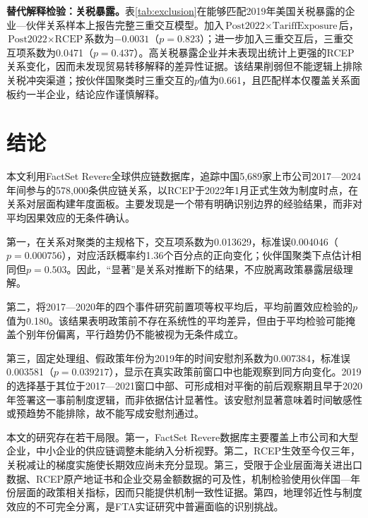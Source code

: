 \documentclass[12pt,a4paper]{ctexart}
\begin{document}
\textbf{替代解释检验：关税暴露。}表\ref{tab:exclusion}在能够匹配2019年美国关税暴露的企业—伙伴关系样本上报告完整三重交互模型。加入$\text{Post2022}\times\text{TariffExposure}$后，$\text{Post2022}\times\text{RCEP}$系数为$-0.0031$（$p=0.823$）；进一步加入三重交互后，三重交互项系数为0.0471（$p=0.437$）。高关税暴露企业并未表现出统计上更强的RCEP关系变化，因而未发现贸易转移解释的差异性证据。该结果削弱但不能逻辑上排除关税冲突渠道；按伙伴国聚类时三重交互的$p$值为0.661，且匹配样本仅覆盖关系面板约一半企业，结论应作谨慎解释。



\section{结论}

本文利用FactSet Revere全球供应链数据库，追踪中国5,689家上市公司2017—2024年间参与的578,000条供应链关系，以RCEP于2022年1月正式生效为制度时点，在关系对层面构建年度面板。主要发现是一个带有明确识别边界的经验结果，而非对平均因果效应的无条件确认。

第一，在关系对聚类的主规格下，交互项系数为0.013629，标准误0.004046（$p=0.000756$），对应活跃概率约1.36个百分点的正向变化；伙伴国聚类下点估计相同但$ p=0.503$。因此，“显著”是关系对推断下的结果，不应脱离政策暴露层级理解。

第二，将2017—2020年的四个事件研究前置项等权平均后，平均前置效应检验的$p$值为0.180。该结果表明政策前不存在系统性的平均差异，但由于平均检验可能掩盖个别年份偏离，平行趋势仍不能被视为无条件成立。

第三，固定处理组、假政策年份为2019年的时间安慰剂系数为0.007384，标准误0.003581（$p=0.039217$），显示在真实政策前窗口中也能观察到同方向变化。2019的选择基于其位于2017—2021窗口中部、可形成相对平衡的前后观察期且早于2020年签署这一事前制度逻辑，而非依据估计显著性。该安慰剂显著意味着时间敏感性或预趋势不能排除，故不能写成安慰剂通过。

本文的研究存在若干局限。第一，FactSet Revere数据库主要覆盖上市公司和大型企业，中小企业的供应链调整未能纳入分析视野。第二，RCEP生效至今仅三年，关税减让的梯度实施使长期效应尚未充分显现。第三，受限于企业层面海关进出口数据、RCEP原产地证书和企业交易金额数据的可及性，机制检验使用伙伴国—年份层面的政策相关指标，因而只能提供机制一致性证据。第四，地理邻近性与制度效应的不可完全分离，是FTA实证研究中普遍面临的识别挑战。
\end{document}
